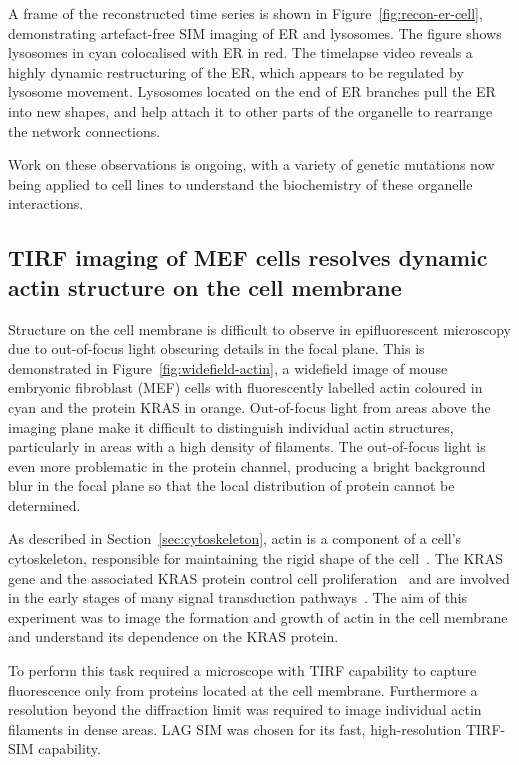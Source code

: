 A frame of the reconstructed time series is shown in Figure~\ref{fig:recon-er-cell}, demonstrating artefact-free SIM imaging of ER and lysosomes.
The figure shows lysosomes in cyan colocalised with ER in red.
The timelapse video reveals a highly dynamic restructuring of the ER, which appears to be regulated by lysosome movement.
Lysosomes located on the end of ER branches pull the ER into new shapes, and help attach it to other parts of the organelle to rearrange the network connections.

Work on these observations is ongoing, with a variety of genetic mutations now being applied to cell lines to understand the biochemistry of these organelle interactions.

\subsection{TIRF imaging of MEF cells resolves dynamic actin structure on the cell membrane}
Structure on the cell membrane is difficult to observe in epifluorescent microscopy due to out-of-focus light obscuring details in the focal plane.
This is demonstrated in Figure~\ref{fig:widefield-actin}, a widefield image of mouse embryonic fibroblast (MEF) cells with fluorescently labelled actin coloured in cyan and the protein KRAS in orange.
Out-of-focus light from areas above the imaging plane make it difficult to distinguish individual actin structures, particularly in areas with a high density of filaments.
The out-of-focus light is even more problematic in the protein channel, producing a bright background blur in the focal plane so that the local distribution of protein cannot be determined.

As described in Section~\ref{sec:cytoskeleton}, actin is a component of a cell's cytoskeleton, responsible for maintaining the rigid shape of the cell~\cite{alberts2013essential}.
The KRAS gene and the associated KRAS protein control cell proliferation~\cite{zimmermann2013small} and are involved in the early stages of many signal transduction pathways~\cite{downward2003targeting, kranenburg2005kras}.
The aim of this experiment was to image the formation and growth of actin in the cell membrane and understand its dependence on the KRAS protein.

To perform this task required a microscope with TIRF capability to capture fluorescence only from proteins located at the cell membrane.
Furthermore a resolution beyond the diffraction limit was required to image individual actin filaments in dense areas.
LAG SIM was chosen for its fast, high-resolution TIRF-SIM capability.

